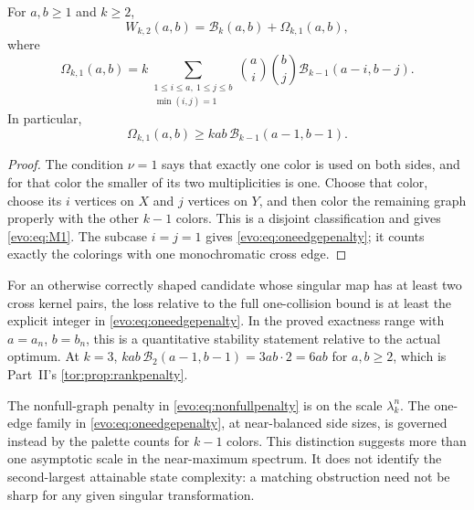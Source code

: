 \documentclass[11pt,a4paper]{article}
\numberwithin{equation}{section}
\theoremstyle{definition}
\theoremstyle{remark}
\newcommand{\Bip}{\mathcal B}
\begin{document}
\begin{proposition}[Manuscript~06]\label{evo:prop:firstmatching}
For $a,b\ge1$ and $k\ge2$,
\begin{equation}\label{evo:eq:W2}
 W_{k,2}(a,b)=\Bip_k(a,b)+\Omega_{k,1}(a,b),
\end{equation}
where
\begin{equation}\label{evo:eq:M1}
 \Omega_{k,1}(a,b)
 =k\sum_{\substack{1\le i\le a,\ 1\le j\le b\\\min(i,j)=1}}
       \binom ai\binom bj\Bip_{k-1}(a-i,b-j).
\end{equation}
In particular,
\begin{equation}\label{evo:eq:oneedgepenalty}
 \Omega_{k,1}(a,b)\ge kab\,\Bip_{k-1}(a-1,b-1).
\end{equation}
\end{proposition}
\begin{proof}
The condition $\nu=1$ says that exactly one color is used on both sides, and
for that color the smaller of its two multiplicities is one. Choose that
color, choose its $i$ vertices on $X$ and $j$ vertices on $Y$, and then color
the remaining graph properly with the other $k-1$ colors. This is a disjoint
classification and gives \eqref{evo:eq:M1}. The subcase $i=j=1$ gives
\eqref{evo:eq:oneedgepenalty}; it counts exactly the colorings with one
monochromatic cross edge.
\end{proof}

For an otherwise correctly shaped candidate whose singular map has at least
two cross kernel pairs, the loss relative to the full one-collision bound is
at least the explicit integer in \eqref{evo:eq:oneedgepenalty}. In the proved
exactness range with $a=a_n$, $b=b_n$, this is a quantitative stability
statement relative to the actual optimum. At $k=3$,
$kab\,\Bip_2(a-1,b-1)=3ab\cdot2=6ab$ for $a,b\ge2$, which is Part~II's
\cref{tor:prop:rankpenalty}.

\begin{remark}\label{evo:rem:scales}
The nonfull-graph penalty in \eqref{evo:eq:nonfullpenalty} is on the scale
$\lambda_k^n$. The one-edge family in \eqref{evo:eq:oneedgepenalty}, at
near-balanced side sizes, is governed instead by the palette counts for $k-1$
colors. This distinction suggests more than one asymptotic scale in the
near-maximum spectrum. It does not identify the second-largest attainable
state complexity: a matching obstruction need not be sharp for any given
singular transformation.
\end{remark}
\end{document}
